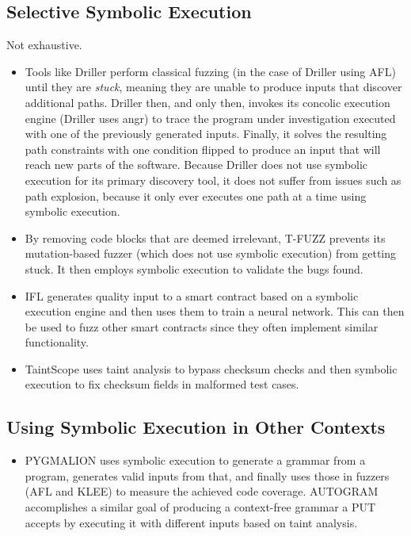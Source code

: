 \documentclass{article}
\begin{document}
\begin{multicols}{2}
    \subsection{Selective Symbolic Execution}
    Not exhaustive.
    \begin{itemize}
        \item Tools like Driller\cite{Driller} perform classical fuzzing (in the case of Driller using AFL\cite{AFLPlusPlus}) until they are \textit{stuck}, meaning they are unable to produce inputs that discover additional paths. Driller then, and only then, invokes its concolic execution engine (Driller uses angr\cite{angr}) to trace the program under investigation executed with one of the previously generated inputs. Finally, it solves the resulting path constraints with one condition flipped to produce an input that will reach new parts of the software. Because Driller does not use symbolic execution for its primary discovery tool, it does not suffer from issues such as path explosion, because it only ever executes one path at a time using symbolic execution.
        \item By removing code blocks that are deemed irrelevant, T-FUZZ\cite{TFuzz} prevents its mutation-based fuzzer (which does not use symbolic execution) from getting stuck. It then employs symbolic execution to validate the bugs found.
        \item IFL\cite{IFL} generates quality input to a smart contract based on a symbolic execution engine and then uses them to train a neural network. This can then be used to fuzz other smart contracts since they often implement similar functionality.
        \item TaintScope\cite{TaintScope} uses taint analysis to bypass checksum checks and then symbolic execution to fix checksum fields in malformed test cases.
    \end{itemize}

    \subsection{Using Symbolic Execution in Other Contexts}
    \begin{itemize}
        \item PYGMALION\cite{PYGMALION} uses symbolic execution to generate a grammar from a program, generates valid inputs from that, and finally uses those in fuzzers (AFL\cite{AFLPlusPlus} and KLEE\cite{KLEE}) to measure the achieved code coverage. AUTOGRAM\cite{AUTOGRAM} accomplishes a similar goal of producing a context-free grammar a PUT accepts by executing it with different inputs based on taint analysis.
    \end{itemize}


\end{multicols}
\end{document}

